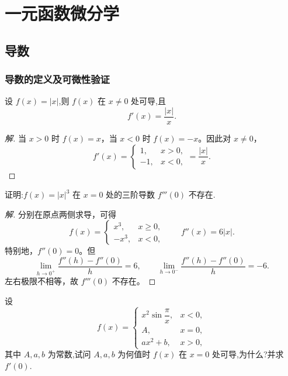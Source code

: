 \documentclass[../../数学分析培优讲义(答案版).tex]{subfiles}
\begin{document}
\setcounter{chapter}{3}
\pagestyle{fancy}

\chapter{一元函数微分学}

\section{导数}

\subsection{导数的定义及可微性验证}

\begin{example}
设 $f(x)=|x|$,则 $f(x)$ 在 $x\neq0$ 处可导,且
\[
    f'(x)=\dfrac{|x|}{x}.
\]
\end{example}

\begin{proof}[解]
当 $x>0$ 时 $f(x)=x$，当 $x<0$ 时 $f(x)=-x$。因此对 $x\neq0$，
\[
    f'(x)=
    \begin{cases}
        1, & x>0,\\
        -1, & x<0,
    \end{cases}
    =\dfrac{|x|}{x}.
\]
\end{proof}

\begin{example}
证明:$f(x)=|x|^3$ 在 $x=0$ 处的三阶导数 $f'''(0)$ 不存在.
\end{example}

\begin{proof}[解]
分别在原点两侧求导，可得
\[
    f(x)=
    \begin{cases}
        x^3, & x\geq0,\\
        -x^3, & x<0,
    \end{cases}
    \qquad
    f''(x)=6|x|.
\]
特别地，$f''(0)=0$。但
\[
    \lim\limits_{h\to0^+}\dfrac{f''(h)-f''(0)}{h}=6,
    \qquad
    \lim\limits_{h\to0^-}\dfrac{f''(h)-f''(0)}{h}=-6.
\]
左右极限不相等，故 $f'''(0)$ 不存在。
\end{proof}

\begin{example}
设
\[
f(x)=
\begin{cases}
    x^2\sin\dfrac{\pi}{x}, & x<0,\\
    A, & x=0,\\
    ax^2+b, & x>0,
\end{cases}
\]
其中 $A,a,b$ 为常数,试问 $A,a,b$ 为何值时 $f(x)$ 在 $x=0$ 处可导,为什么?并求 $f'(0)$.
\end{example}
\end{document}
